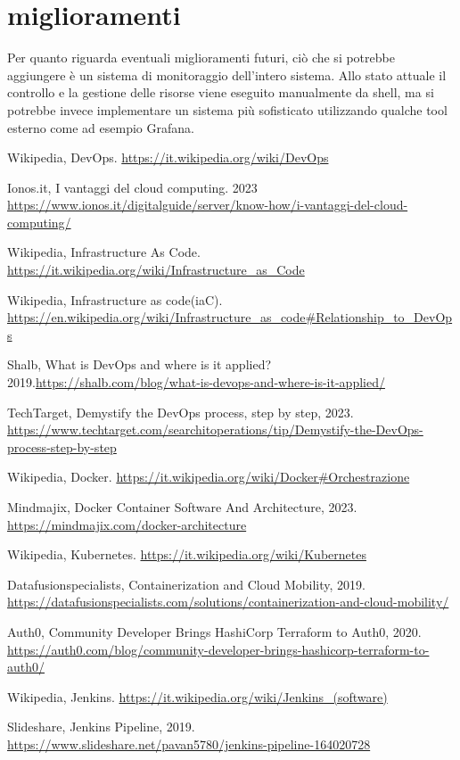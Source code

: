 \documentclass[a4paper,12pt]{report}
\begin{document}
\section{miglioramenti}
Per quanto riguarda eventuali miglioramenti futuri, ciò che si potrebbe aggiungere è un sistema di monitoraggio dell'intero sistema. Allo stato attuale il controllo e la gestione delle risorse viene eseguito manualmente da shell, ma si potrebbe invece implementare un sistema più sofisticato utilizzando qualche tool esterno come ad esempio Grafana.
%
%
\begin{thebibliography}{00}
%

Wikipedia, DevOps. \url{https://it.wikipedia.org/wiki/DevOps}

Ionos.it, I vantaggi del cloud computing. 2023 \url{https://www.ionos.it/digitalguide/server/know-how/i-vantaggi-del-cloud-computing/}


Wikipedia, Infrastructure As Code. \url{https://it.wikipedia.org/wiki/Infrastructure_as_Code}

Wikipedia, Infrastructure as code(iaC). \url{https://en.wikipedia.org/wiki/Infrastructure_as_code#Relationship_to_DevOps}

Shalb, What is DevOps and where is it applied? 2019.\url{https://shalb.com/blog/what-is-devops-and-where-is-it-applied/}


TechTarget, Demystify the DevOps process, step by step, 2023. \url{https://www.techtarget.com/searchitoperations/tip/Demystify-the-DevOps-process-step-by-step}

Wikipedia, Docker. \url{https://it.wikipedia.org/wiki/Docker#Orchestrazione}

Mindmajix, Docker Container Software And Architecture, 2023. \url{https://mindmajix.com/docker-architecture}

Wikipedia, Kubernetes. \url{https://it.wikipedia.org/wiki/Kubernetes}

Datafusionspecialists, Containerization and Cloud Mobility, 2019. \url{https://datafusionspecialists.com/solutions/containerization-and-cloud-mobility/}

Auth0, Community Developer Brings HashiCorp Terraform to Auth0, 2020. \url{https://auth0.com/blog/community-developer-brings-hashicorp-terraform-to-auth0/}

Wikipedia, Jenkins. \url{https://it.wikipedia.org/wiki/Jenkins_(software)}

Slideshare, Jenkins Pipeline, 2019. \url{https://www.slideshare.net/pavan5780/jenkins-pipeline-164020728}

%
%
\end{thebibliography}
% 
\end{document}
